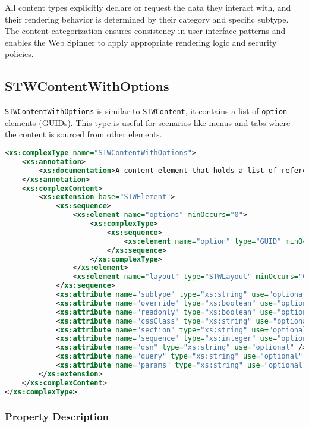 All content types explicitly declare or request the data they interact with, and their rendering behavior is determined by their category and specific subtype. The content categorization ensures consistency in user interface patterns and enables the Web Spinner to apply appropriate rendering logic and security policies.

\subsection{STWContentWithOptions}

	\texttt{STWContentWithOptions} is similar to \texttt{STWContent}, it contains a list of \texttt{option} elements (GUIDs). This type is useful for scenarios like menus and tabs where the content is sourced from other elements.

\begin{lstlisting}[language=XML,caption={STWContentWithOptions Type Definition}]
<xs:complexType name="STWContentWithOptions">
	<xs:annotation>
		<xs:documentation>A content element that holds a list of references (options) to other STWElements, instead of nested child elements. Useful for menus and tabs where content is sourced from elsewhere.</xs:documentation>
	</xs:annotation>
	<xs:complexContent>
		<xs:extension base="STWElement">
			<xs:sequence>
				<xs:element name="options" minOccurs="0">
					<xs:complexType>
						<xs:sequence>
							<xs:element name="option" type="GUID" minOccurs="0" maxOccurs="unbounded" />
						</xs:sequence>
					</xs:complexType>
				</xs:element>
				<xs:element name="layout" type="STWLayout" minOccurs="0" />
			</xs:sequence>
			<xs:attribute name="subtype" type="xs:string" use="optional" />
			<xs:attribute name="override" type="xs:boolean" use="optional" />
			<xs:attribute name="readonly" type="xs:boolean" use="optional" />
			<xs:attribute name="cssClass" type="xs:string" use="optional" />
			<xs:attribute name="section" type="xs:string" use="optional" />
			<xs:attribute name="sequence" type="xs:integer" use="optional" />
			<xs:attribute name="dsn" type="xs:string" use="optional" />
			<xs:attribute name="query" type="xs:string" use="optional" />
			<xs:attribute name="params" type="xs:string" use="optional" />
		</xs:extension>
	</xs:complexContent>
</xs:complexType>
\end{lstlisting}

\subsubsection{Property Description}

